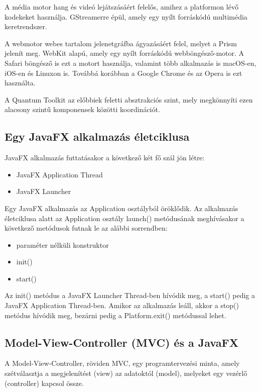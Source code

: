 A média motor hang és videó lejátszásáért felelős, amihez a platformon lévő kodekeket használja.
GStreamerre épül, amely egy nyílt forráskódú multimédia keretrendszer.

A webmotor webes tartalom jelenetgráfba ágyazásáért felel, melyet a Prism jelenít meg.
WebKit alapú, amely egy nyílt forráskódú webböngésző-motor.
A Safari böngésző is ezt a motort használja, valamint több alkalmazás is macOS-en, iOS-en és Linuxon is.
Továbbá korábban a Google Chrome és az Opera is ezt használta.

A Quantum Toolkit az előbbiek feletti absztrakciós szint, mely megkönnyíti ezen alacsony szintű komponensek közötti koordinációt.


\subsection*{Egy JavaFX alkalmazás életciklusa}

JavaFX alkalmazás futtatásakor a következő két fő szál jön létre: 

\begin{itemize}
\item JavaFX Application Thread 
\item JavaFX Launcher 
\end{itemize}

Egy JavaFX alkalmazás az Application osztályból öröklődik.
Az alkalmazás életciklusa alatt az Application osztály launch() metódusának meghívásakor a következő metódusok futnak le az alábbi sorrendben: 

\begin{itemize}
\item paraméter nélküli konstruktor 
\item init() 
\item start() 
\end{itemize}

Az init() metódus a JavaFX Launcher Thread-ben hívódik meg, a start() pedig a JavaFX Application Thread-ben.
Amikor az alkalmazás leáll, akkor a stop() metódus hívódik meg, bezárni pedig a Platform.exit() metódussal lehet.  

\subsection*{Model-View-Controller (MVC) és a JavaFX}

A Model-View-Controller, röviden MVC, egy programtervezési minta, amely szétválasztja a megjelenítést (view) az adatoktól (model), melyeket egy vezérlő (controller) kapcsol össze. 

